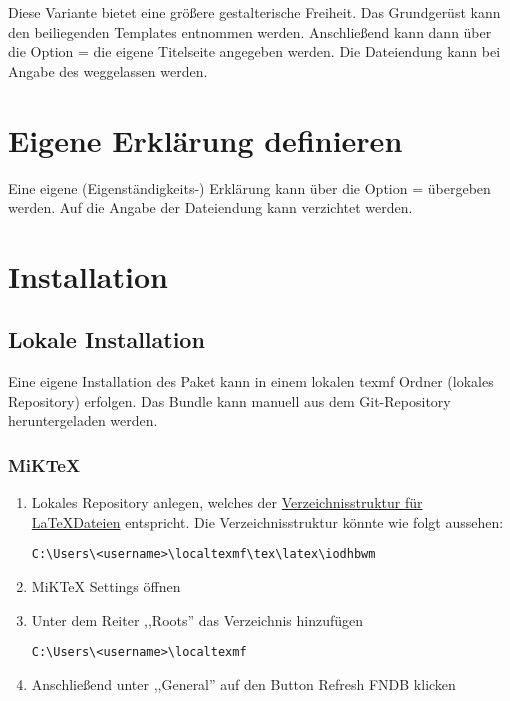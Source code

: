 \documentclass[babel=ngerman,highlight=false]{skdoc}
\begin{document}
            Diese Variante bietet eine größere gestalterische Freiheit. Das Grundgerüst kann den beiliegenden Templates entnommen werden. Anschließend kann dann über die Option  =  die eigene Titelseite angegeben werden. Die Dateiendung kann bei Angabe des  weggelassen werden.
            
        \section{Eigene Erklärung definieren}
            Eine eigene (Eigenständigkeits-) Erklärung kann über die Option  =  übergeben werden. Auf die Angabe der Dateiendung kann verzichtet werden.
            
            
    \section{Installation}
        \subsection{Lokale Installation}
            Eine eigene Installation des Paket kann in einem lokalen texmf Ordner (lokales Repository) erfolgen. Das Bundle kann manuell aus dem Git-Repository heruntergeladen werden.
            
            \subsubsection{MiKTeX}
                \begin{enumerate}
                    \item Lokales Repository anlegen, welches der \href{http://tug.ctan.org/tds/tds.html}{Verzeichnisstruktur für \LaTeX Dateien} entspricht. Die Verzeichnisstruktur könnte wie folgt aussehen:\par \verb|C:\Users\<username>\localtexmf\tex\latex\iodhbwm|
                    \item MiKTeX Settings öffnen
                    \item Unter dem Reiter ,,Roots'' das Verzeichnis hinzufügen\par \verb|C:\Users\<username>\localtexmf|
                    \item Anschließend unter ,,General'' auf den Button Refresh FNDB klicken
                \end{enumerate}
            
\end{document}
